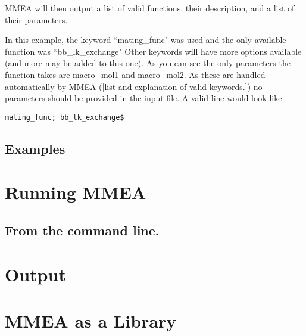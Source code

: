 \documentclass{article}
\begin{document}
MMEA will then output a list of valid functions, their description, and a list of their parameters.


In this example, the keyword ``mating\_func" was used and the only available function was ``bb\_lk\_exchange" Other keywords will have more options available (and more may be added to this one). As you can see the only parameters the function takes are macro\_mol1 and macro\_mol2. As these are handled automatically by MMEA (\ref{list and explanation of valid keywords.}) no parameters should be provided in the input file. A valid line would look like
\begin{verbatim}
mating_func; bb_lk_exchange$
\end{verbatim}



\subsection{Examples}


\section{Running MMEA}

\subsection{From the command line.}


\section{Output}

\section{MMEA as a Library}
\end{document}
